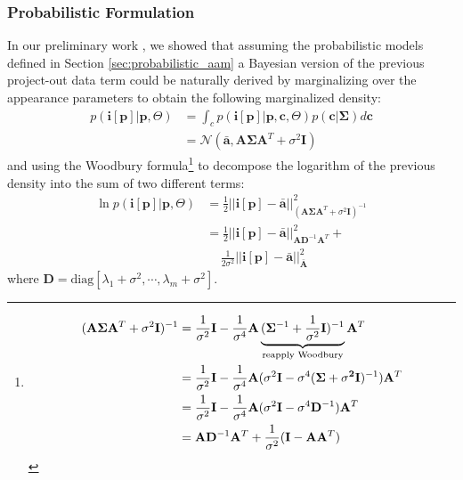 \subsubsection*{Probabilistic Formulation}
\label{sec:po_pi}
In our preliminary work \cite{Alabort2014}, we showed that assuming the probabilistic models defined in Section \ref{sec:probabilistic_aam} a Bayesian version of the previous project-out data term could be naturally derived by marginalizing over the appearance parameters to obtain the following marginalized density:
\begin{equation}
    \begin{aligned}
        p(\mathbf{i}[\mathbf{p}] | \mathbf{p}, \Theta) & = \int_c p(\mathbf{i}[\mathbf{p}] | \mathbf{p}, \mathbf{c}, \Theta) p(\mathbf{c}|\mathbf{\Sigma}) d\mathbf{c} 
        \\
        & = \mathcal{N}(\bar{\mathbf{a}}, \mathbf{A}\mathbf{\Sigma}\mathbf{A}^T + \sigma^2 \mathbf{I})
    \end{aligned}
    \label{eq:marginal}
\end{equation}
and using the Woodbury formula\footnote{
\begin{equation*}
    \begin{aligned}
    \small
    	(\mathbf{A} \mathbf{\Sigma} \mathbf{A}^T + \sigma^2 \mathbf{I})^{-1} & = \frac{1}{\sigma^2} \mathbf{I} - \frac{1}{\sigma^4} \mathbf{A} \underbrace{(\mathbf{\Sigma}^{-1} + \frac{1}{\sigma^2}\mathbf{I})^{-1}}_{\textrm{reapply Woodbury}} \mathbf{A}^T
    	\\
    	& = \frac{1}{\sigma^2} \mathbf{I} - \frac{1}{\sigma^4} \mathbf{A} (\sigma^2\mathbf{I} - \sigma^4(\mathbf{\Sigma + \sigma^2\mathbf{I}})^{-1}) \mathbf{A}^T
    	\\
    	& = \frac{1}{\sigma^2} \mathbf{I} - \frac{1}{\sigma^4} \mathbf{A} (\sigma^2\mathbf{I} - \sigma^4\mathbf{D}^{-1}) \mathbf{A}^T
    	\\
    	& = \mathbf{A}\mathbf{D}^{-1}\mathbf{A}^T + \frac{1}{\sigma^2} (\mathbf{I} - \mathbf{A}\mathbf{A}^T)
    \end{aligned}
    \label{eq:woodbury}
\end{equation*}} \cite{Woodbury1950} to decompose the logarithm of the previous density into the sum of two different terms:
\begin{equation}
    \begin{aligned}
        \ln p(\mathbf{i}[\mathbf{p}] | \mathbf{p}, \Theta) & = \frac{1}{2}|| \mathbf{i}[\mathbf{p}] - \mathbf{\bar{a}} ||^2_{(\mathbf{A}\mathbf{\Sigma}\mathbf{A}^T + \sigma^2 \mathbf{I})^{-1}}
        \\
        & = \frac{1}{2}|| \mathbf{i}[\mathbf{p}] - \mathbf{\bar{a}} ||^2_{\mathbf{A}\mathbf{D}^{-1}\mathbf{A}^T} + 
        \\
        & \quad \, \frac{1}{2\sigma^2}|| \mathbf{i}[\mathbf{p}] - \mathbf{\bar{a}} ||^2_{\bar{\mathbf{A}}}
    \end{aligned}
    \label{eq:prob_po}
\end{equation}
where $\mathbf{D} = \textrm{diag}[\lambda_1 + \sigma^2, \cdots, \lambda_m + \sigma^2]$.

